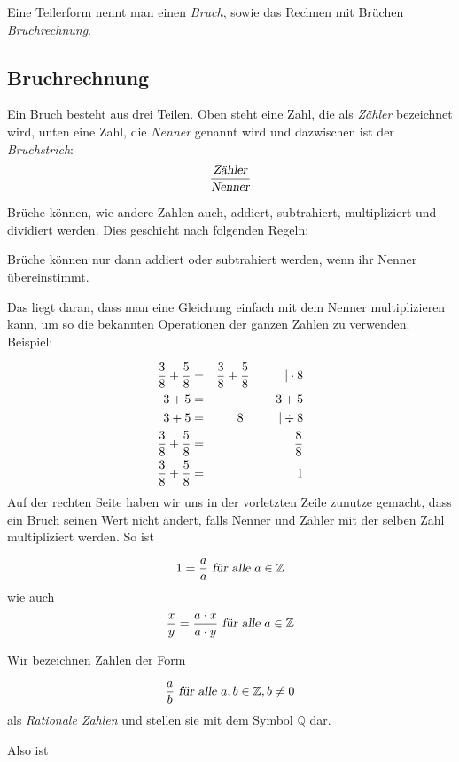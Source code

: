 \begin{definition}
Eine Teilerform nennt man einen \textsl{Bruch}, sowie das Rechnen mit Brüchen \textsl{Bruchrechnung}.
\end{definition}

\subsection{Bruchrechnung}

\begin{definition}
Ein Bruch besteht aus drei Teilen. Oben steht eine Zahl, die als \textsl{Zähler} bezeichnet wird, unten eine Zahl, die \textsl{Nenner} genannt wird und dazwischen ist der \textsl{Bruchstrich}:
\[ \frac{\textsl{Zähler}}{\textsl{Nenner}} \]
\end{definition}

Brüche können, wie andere Zahlen auch, addiert, subtrahiert, multipliziert und dividiert werden. Dies geschieht nach folgenden Regeln:

\begin{definition}
Brüche können nur dann addiert oder subtrahiert werden, wenn ihr Nenner übereinstimmt. 
\end{definition}

Das liegt daran, dass man eine Gleichung einfach mit dem Nenner multiplizieren kann, um so die bekannten Operationen der ganzen Zahlen zu verwenden. Beispiel:

\begin{eqnarray*}
\frac{3}{8}+\frac{5}{8} &=& \frac{3}{8}+\frac{5}{8} \hskip 1cm | \cdot 8 \\
3 +5 &=& 3+5 \\
3+5 &=& 8 \hskip 1cm | \div 8\\
\frac{3}{8}+\frac{5}{8} &=& \frac{8}{8} \\
\frac{3}{8}+\frac{5}{8} &=& 1
\end{eqnarray*}
Auf der rechten Seite haben wir uns in der vorletzten Zeile zunutze gemacht, dass ein Bruch seinen Wert nicht ändert, falls Nenner und Zähler mit der selben Zahl multipliziert werden. So ist 

\[ 1 = \frac{a}{a} \textsl{ für alle } a\in \mathbb{Z} \]
wie auch 
\begin{equation}
\label{relation}
\frac{x}{y} = \frac{a\cdot x}{a\cdot y} \textsl{ für alle } a\in \mathbb{Z}
\end{equation}

\begin{definition}
Wir bezeichnen Zahlen der Form 

\[ \frac{a}{b} \textsl{ für alle } a,b \in \mathbb{Z}, b\ne 0\]
als \textsl{Rationale Zahlen} und stellen sie mit dem Symbol $\mathbb{Q}$ dar. 
\end{definition}
Also ist 

